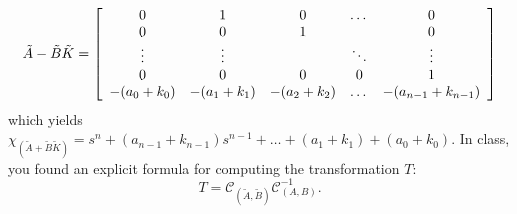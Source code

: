 \[
    \tilde{A}-\tilde{B}\tilde{K} =
    \left[\begin{array}{c c c c  c}
            0          & 1          & 0          & \dots  & 0                  \\
            0          & 0          & 1          &        & 0                  \\
            \vdots     & \vdots     &            & \ddots & \vdots             \\
            0          & 0          & 0          & 0      & 1                  \\
            -(a_0+k_0) & -(a_1+k_1) & -(a_2+k_2) & \dots  & -(a_{n-1}+k_{n-1})
        \end{array}\right]
\]
which yields $\chi_{(\tilde{A}+\tilde{B}\tilde{K})} = s^n + (a_{n-1}+k_{n-1})s^{n-1} + \dots + (a_1 + k_1) + (a_0 + k_0)$. In class, you found an explicit formula for computing the transformation $T$:
\[
    T=\mathcal{C}_{(\tilde{A},\tilde{B})} \mathcal{C}_{(A,B)}^{-1}.
\]

